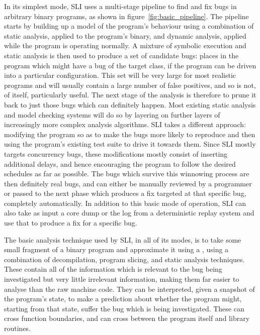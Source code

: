 In its simplest mode, SLI uses a multi-stage pipeline to find and fix bugs in arbitrary binary programs, as shown in figure~\ref{fig:basic_pipeline}.
The pipeline starts by building up a model of the program's behaviour using a combination of static analysis, applied to the program's binary, and dynamic analysis, applied while the program is operating normally.
A mixture of symbolic execution and static analysis is then used to produce a set of candidate bugs: places in the program which might have a bug of the target class, if the program can be driven into a particular configuration.
This set will be very large for most realistic programs and will usually contain a large number of false positives, and so is not, of itself, particularly useful.
The next stage of the analysis is therefore to prune it back to just those bugs which can definitely happen.
Most existing static analysis and model checking systems will do so by layering on further layers of increasingly more complex analysis algorithms.
SLI takes a different approach: modifying the program so as to make the bugs more likely to reproduce and then using the program's existing test suite to drive it towards them.
Since SLI mostly targets concurrency bugs, these modifications mostly consist of inserting additional delays, and hence encouraging the program to follow the desired schedules as far as possible.
The bugs which survive this winnowing process are then definitely real bugs, and can either be manually reviewed by a programmer or passed to the next phase which produces a fix targeted at that specific bug, completely automatically.
In addition to this basic mode of operation, SLI can also take as input a core dump or the log from a deterministic replay system and use that to produce a fix for a specific bug.

The basic analysis technique used by SLI, in all of its modes, is to take some small fragment of a binary program and approximate it using a \StateMachine, using a combination of decompilation, program slicing, and static analysis techniques.
These \StateMachines contain all of the information which is relevant to the bug being investigated but very little irrelevant information, making them far easier to analyse than the raw machine code.
They can be interpreted, given a snapshot of the program's state, to make a prediction about whether the program might, starting from that state, suffer the bug which is being investigated.
These \StateMachines can cross function boundaries, and can cross between the program itself and library routines.

